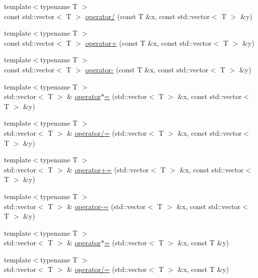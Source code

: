 \begin{DoxyCompactItemize}
\item 
{\footnotesize template$<$typename T $>$ }\\const std\+::vector$<$ T $>$ \hyperlink{namespace_c_o_n_t_r_a_l_i_g_n_a514e32eb89504fc0d503a0350ff381cb}{operator/} (const T \&x, const std\+::vector$<$ T $>$ \&y)
\item 
{\footnotesize template$<$typename T $>$ }\\const std\+::vector$<$ T $>$ \hyperlink{namespace_c_o_n_t_r_a_l_i_g_n_ac43e8f22ac47bc4ce841bfc8c3fd943a}{operator+} (const T \&x, const std\+::vector$<$ T $>$ \&y)
\item 
{\footnotesize template$<$typename T $>$ }\\const std\+::vector$<$ T $>$ \hyperlink{namespace_c_o_n_t_r_a_l_i_g_n_abf9d5632e8a4feaa3d5b254ac83ccd03}{operator-\/} (const T \&x, const std\+::vector$<$ T $>$ \&y)
\item 
{\footnotesize template$<$typename T $>$ }\\std\+::vector$<$ T $>$ \& \hyperlink{namespace_c_o_n_t_r_a_l_i_g_n_aafc1ce4aa4d97210186c358eec543740}{operator$\ast$=} (std\+::vector$<$ T $>$ \&x, const std\+::vector$<$ T $>$ \&y)
\item 
{\footnotesize template$<$typename T $>$ }\\std\+::vector$<$ T $>$ \& \hyperlink{namespace_c_o_n_t_r_a_l_i_g_n_a0100c7e8af5633fb403d3cbeee1f0dce}{operator/=} (std\+::vector$<$ T $>$ \&x, const std\+::vector$<$ T $>$ \&y)
\item 
{\footnotesize template$<$typename T $>$ }\\std\+::vector$<$ T $>$ \& \hyperlink{namespace_c_o_n_t_r_a_l_i_g_n_ad2bf01877959caf081dbde8bac578f3f}{operator+=} (std\+::vector$<$ T $>$ \&x, const std\+::vector$<$ T $>$ \&y)
\item 
{\footnotesize template$<$typename T $>$ }\\std\+::vector$<$ T $>$ \& \hyperlink{namespace_c_o_n_t_r_a_l_i_g_n_af0e8c5f8fbce7e6a51b426e6ac663b30}{operator-\/=} (std\+::vector$<$ T $>$ \&x, const std\+::vector$<$ T $>$ \&y)
\item 
{\footnotesize template$<$typename T $>$ }\\std\+::vector$<$ T $>$ \& \hyperlink{namespace_c_o_n_t_r_a_l_i_g_n_a4da5ff7c4e30e9e3ac87eeecc67fb638}{operator$\ast$=} (std\+::vector$<$ T $>$ \&x, const T \&y)
\item 
{\footnotesize template$<$typename T $>$ }\\std\+::vector$<$ T $>$ \& \hyperlink{namespace_c_o_n_t_r_a_l_i_g_n_a821d8b72ad691f1e5b42ffe21b0c05d8}{operator/=} (std\+::vector$<$ T $>$ \&x, const T \&y)

\end{DoxyCompactItemize}
